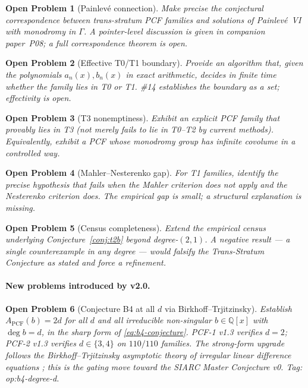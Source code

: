 \documentclass[11pt,a4paper]{article}
\newtheorem{problem}{Open Problem}
\theoremstyle{definition}
\theoremstyle{remark}
\newcommand{\Q}{\mathbb{Q}}
\begin{document}
\begin{problem}[Painlev\'e connection]
\label{prob:painleve}
Make precise the conjectural correspondence between trans-stratum PCF
families and solutions of Painlevé~VI with monodromy in $\Gamma$.
A pointer-level discussion is given in companion paper~P08; a full
correspondence theorem is open.
\end{problem}

\begin{problem}[Effective T0/T1 boundary]
\label{prob:effective}
Provide an algorithm that, given the polynomials $a_n(x), b_n(x)$ in
exact arithmetic, decides in finite time whether the family lies in
T0 or T1. \#14 establishes the boundary as a set; effectivity is open.
\end{problem}

\begin{problem}[T3 nonemptiness]
\label{prob:t3}
Exhibit an explicit PCF family that provably lies in T3 (not merely
fails to lie in T0--T2 by current methods). Equivalently, exhibit a
PCF whose monodromy group has infinite covolume in a controlled way.
\end{problem}

\begin{problem}[Mahler--Nesterenko gap]
\label{prob:mahler}
For T1 families, identify the precise hypothesis that fails when the
Mahler criterion does not apply and the Nesterenko criterion does.
The empirical gap is small; a structural explanation is missing.
\end{problem}

\begin{problem}[Census completeness]
\label{prob:census}
Extend the empirical census underlying Conjecture~\ref{conj:t2b}
beyond degree-$(2,1)$. A negative result --- a single counterexample
in any degree --- would falsify the Trans-Stratum Conjecture as
stated and force a refinement.
\end{problem}

\paragraph{New problems introduced by v2.0.}

\begin{problem}[Conjecture B4 at all $d$ via Birkhoff--Trjitzinsky]
\label{prob:b4-allD}
Establish $A_{\mathrm{PCF}}(b) = 2d$ for all $d$ and all
irreducible non-singular $b \in \Q[x]$ with $\deg b = d$, in the
sharp form of \eqref{eq:b4-conjecture}. PCF-1 v1.3 verifies $d=2$;
PCF-2 v1.3 verifies $d \in \{3, 4\}$ on $110/110$ families. The
strong-form upgrade follows the Birkhoff--Trjitzinsky asymptotic
theory of irregular linear difference equations \cite{Birkhoff1930,
BirkhoffTrjitzinsky1933}; this is the gating move toward the
SIARC Master Conjecture v0.
Tag: \textsf{op:b4-degree-d}.
\end{problem}
\end{document}

